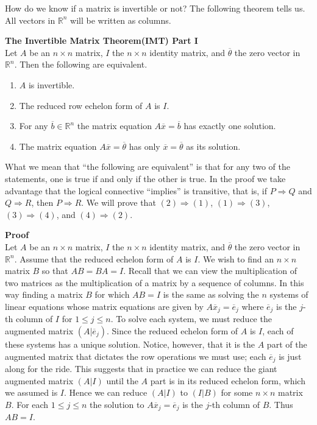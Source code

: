 \documentclass[12pt]{article}
\def\it{\item}
\def\be{\begin{enumerate}} \def\ee{\end{enumerate}}
\def\bar#1{\overline{#1}}
\def\th{\theta} \def\al{\alpha} \def\ba{\beta} \def\ga{\gamma}
\def\R{\mathbb{R}} \def\Q{\mathbb{Q}} \def\N{\mathbb{N}} \def\Z{\mathbb{Z}} \def\P{\mathbb{P}}
\begin{document}
How do we know if a matrix is invertible or not? The following theorem tells us. All vectors in $\R^n$ will be written as columns.

\newpage

\noindent
{\bf The Invertible Matrix Theorem(IMT) Part I} \\
Let $A$ be an $n \times n$ matrix, $I$ the $n \times n$ identity matrix, and $\bar{\th}$ the zero vector in $\R^n$. Then the following are equivalent.
\be
\it $A$ is invertible.
\it The reduced row echelon form of $A$ is $I$.
\it For any $\bar{b} \in \R^n$ the matrix equation $A\bar{x} = \bar{b}$ has exactly one solution.
\it The matrix equation $A\bar{x} = \bar{\th}$ has only $\bar{x} = \bar{\th}$ as its solution.
\ee

What we mean that ``the following are equivalent'' is that for any two of the statements, one is true if and only if the other is true. In the proof we take advantage that the logical connective ``implies'' is transitive, that is, if $P \Rightarrow Q$ and $Q \Rightarrow R$, then $P \Rightarrow R$. We will prove that $(2) \Rightarrow (1)$, $(1) \Rightarrow (3)$, $(3) \Rightarrow (4)$, and $(4) \Rightarrow (2)$.

\noindent
{\bf Proof} \\
Let $A$ be an $n \times n$ matrix, $I$ the $n \times n$ identity matrix, and $\bar{\th}$ the zero vector in $\R^n$. Assume that the reduced echelon form of $A$ is $I$. We wish to find an $n \times n$ matrix $B$ so that $AB = BA = I$. Recall that we can view the multiplication of two matrices as the multiplication of a matrix by a sequence of columns. In this way finding a matrix $B$ for which $AB = I$ is the same as solving the $n$ systems of linear equations whose matrix equations are given by $A\bar{x}_j = \bar{e}_j$ where $\bar{e}_j$ is the $j$-th column of $I$ for $1 \leq j \leq n$. To solve each system, we must reduce the augmented matrix $(A | \bar{e}_j)$. Since the reduced echelon form of $A$ is $I$, each of these systems has a unique solution. Notice, however, that it is the 
$A$ part of the augmented matrix that dictates the row operations we must use; each $\bar{e}_j$ is just along for the ride. This suggests that in practice we can  reduce the giant augmented matrix $(A | I)$ until the $A$ part is in its reduced echelon form, which we assumed is $I$. Hence we can reduce $(A | I)$ to 
$(I | B)$ for some $n \times n$ matrix $B$. For each $1 \leq j \leq n$ the solution to $A\bar{x}_j = \bar{e}_j$ is the $j$-th column of $B$. Thus $AB = I$.
\end{document}
